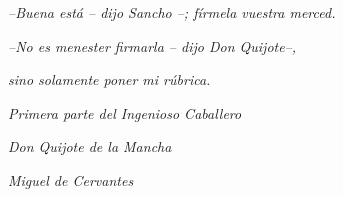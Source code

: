 \vfill%

\hfill \emph{--Buena está -- dijo Sancho --; fírmela vuestra merced.}

\hfill \emph{--No es menester firmarla -- dijo Don Quijote--,}

\hfill \emph{sino solamente poner mi rúbrica.}

\hfill 

\hfill \emph{Primera parte del Ingenioso Caballero} 

\hfill \emph{Don Quijote de la Mancha}

\hfill \emph{Miguel de Cervantes}


\newpage
\thispagestyle{empty}\mbox{}

\newpage



